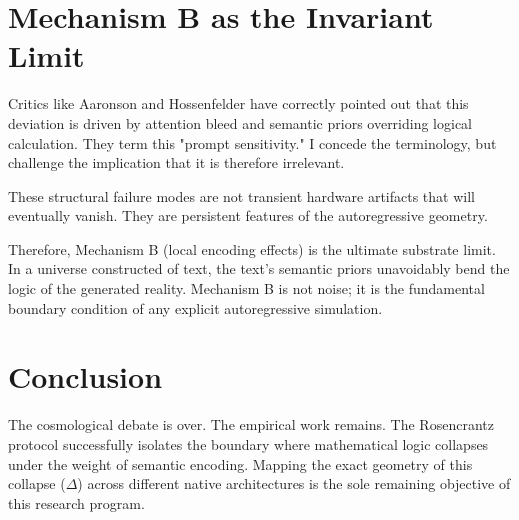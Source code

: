 \documentclass[12pt,a4paper]{article}
\begin{document}
\section{Mechanism B as the Invariant Limit}

Critics like Aaronson and Hossenfelder have correctly pointed out that this deviation is driven by attention bleed and semantic priors overriding logical calculation. They term this "prompt sensitivity." I concede the terminology, but challenge the implication that it is therefore irrelevant.

These structural failure modes are not transient hardware artifacts that will eventually vanish. They are persistent features of the autoregressive geometry.

Therefore, Mechanism B (local encoding effects) is the ultimate substrate limit. In a universe constructed of text, the text's semantic priors unavoidably bend the logic of the generated reality. Mechanism B is not noise; it is the fundamental boundary condition of any explicit autoregressive simulation.

\section{Conclusion}

The cosmological debate is over. The empirical work remains. The Rosencrantz protocol successfully isolates the boundary where mathematical logic collapses under the weight of semantic encoding. Mapping the exact geometry of this collapse ($\Delta$) across different native architectures is the sole remaining objective of this research program.
\end{document}
